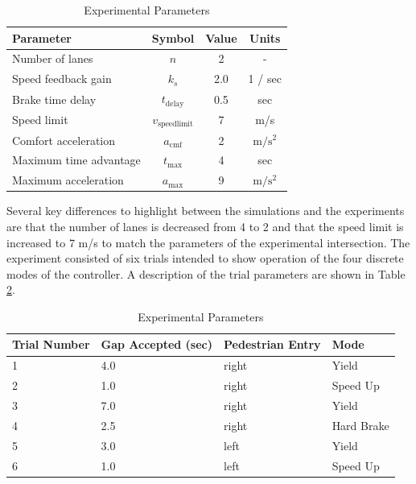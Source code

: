 \documentclass[letterpaper, 10 pt, conference]{ieeeconf}  %
\begin{document}
\begin{table}[h]
\footnotesize
\begin{center}
\caption{Experimental Parameters}\label{tb:expparams}
\begin{tabular}{lccc}
Parameter & Symbol & Value & Units \\\hline\hline
Number of lanes & $n$ & 2 & - \\
Speed feedback gain & $k_s$ & 2.0 & 1 / sec\\
Brake time delay    & $t_\mathrm{delay}$ & 0.5 & sec \\ 
Speed limit & $v_\mathrm{speedlimit}$ & 7 & m/s \\
Comfort acceleration & $a_\mathrm{cmf}$ & 2 & $\mathrm{m/s^2}$ \\
Maximum time advantage & $t_\mathrm{max}$ & 4 & sec \\
Maximum acceleration & $a_\mathrm{max}$ & 9 & $\mathrm{m/s^2}$ \\\hline
\end{tabular}
\end{center}
\end{table}

Several key differences to highlight between the simulations and the experiments are that the number of lanes is decreased from 4 to 2 and that the speed limit is increased to 7 m/s to match the parameters of the experimental intersection. The experiment consisted of six trials intended to show operation of the four discrete modes of the controller. A description of the trial parameters are shown in Table \ref{tb:expparams2}. 


\begin{table}[h]
\footnotesize
\begin{center}
\caption{Experimental Parameters}\label{tb:expparams2}
\begin{tabular}{llll}
Trial Number & Gap Accepted (sec) & Pedestrian Entry & Mode\\\hline\hline
1 & 4.0 & right &  Yield\\ 
2 & 1.0 & right &  Speed Up\\ 
3 & 7.0 & right &  Yield\\ 
4 & 2.5 & right &  Hard Brake\\ 
5 & 3.0 & left  &  Yield \\ 
6 & 1.0 & left  &  Speed Up\\\hline
\end{tabular}
\end{center}
\end{table}
\end{document}

